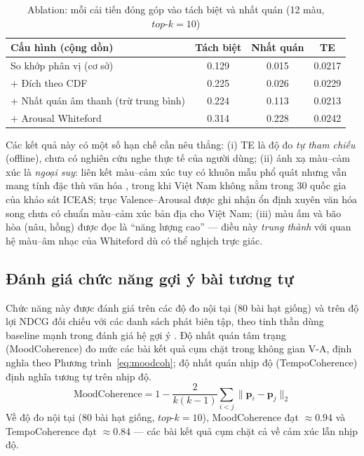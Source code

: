 \documentclass[../DoAn.tex]{subfiles}
\begin{document}
\begin{table}[h!]
\centering
\caption{Ablation: mỗi cải tiến đóng góp vào tách biệt và nhất quán (12 màu, $top\text{-}k=10$)}
\label{table:ablation}
\begin{tabular}{p{5.4cm} c c c}
\toprule
\textbf{Cấu hình (cộng dồn)} & \textbf{Tách biệt} & \textbf{Nhất quán} & \textbf{TE} \\
\midrule
So khớp phân vị (cơ sở) & 0.129 & 0.015 & 0.0217 \\
+ Đích theo CDF & 0.225 & 0.026 & 0.0229 \\
+ Nhất quán âm thanh (trừ trung bình) & 0.224 & 0.113 & 0.0213 \\
+ Arousal Whiteford & 0.314 & 0.228 & 0.0242 \\
\bottomrule
\end{tabular}
\end{table}

Các kết quả này có một số hạn chế cần nêu thẳng: (i) TE là độ đo \textit{tự tham chiếu} (offline), chưa có nghiên cứu nghe thực tế của người dùng; (ii) ánh xạ màu--cảm xúc là \textit{ngoại suy}: liên kết màu--cảm xúc tuy có khuôn mẫu phổ quát nhưng vẫn mang tính đặc thù văn hóa \cite{jonauskaite2019ml}, trong khi Việt Nam không nằm trong 30 quốc gia của khảo sát ICEAS; trục Valence--Arousal được ghi nhận ổn định xuyên văn hóa \cite{lee2025globalmood} song chưa có chuẩn màu--cảm xúc bản địa cho Việt Nam; (iii) màu ấm và bão hòa (nâu, hồng) được đọc là ``năng lượng cao'' --- điều này \textit{trung thành} với quan hệ màu--âm nhạc của Whiteford dù có thể nghịch trực giác.

\subsection{Đánh giá chức năng gợi ý bài tương tự}
\label{subsection:eval-similar}
Chức năng này được đánh giá trên các độ đo nội tại (80 bài hạt giống) và trên độ lợi NDCG \cite{steck2018calibrated} đối chiếu với các danh sách phát biên tập, theo tinh thần dùng baseline mạnh trong đánh giá hệ gợi ý \cite{dacrema2019progress}. Độ nhất quán tâm trạng (MoodCoherence) đo mức các bài kết quả cụm chặt trong không gian V-A, định nghĩa theo Phương trình~\eqref{eq:moodcoh}; độ nhất quán nhịp độ (TempoCoherence) định nghĩa tương tự trên nhịp độ.
\begin{equation}\label{eq:moodcoh}
    \text{MoodCoherence} = 1 - \frac{2}{k(k-1)}\sum_{i<j} \big\lVert \mathbf{p}_i - \mathbf{p}_j \big\rVert_2
\end{equation}
Về độ đo nội tại (80 bài hạt giống, $top\text{-}k=10$), MoodCoherence đạt $\approx 0.94$ và TempoCoherence đạt $\approx 0.84$ --- các bài kết quả cụm chặt cả về cảm xúc lẫn nhịp độ.
\end{document}
